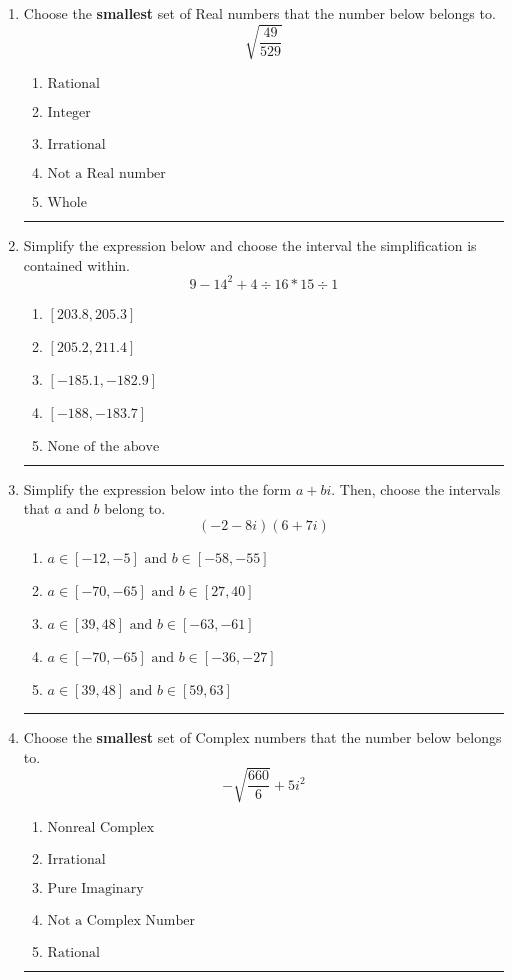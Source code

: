 \documentclass[14pt]{extbook}
\newcommand{\litem}[1]{\item#1\hspace*{-1cm}\rule{\textwidth}{0.4pt}}
\begin{document}
\begin{enumerate}
{\begin{enumerate}[label=\Alph*.]
\end{enumerate} }
\litem{
Choose the \textbf{smallest} set of Real numbers that the number below belongs to.\[ \sqrt{\frac{49}{529}} \]\begin{enumerate}[label=\Alph*.]
\item \( \text{Rational} \)
\item \( \text{Integer} \)
\item \( \text{Irrational} \)
\item \( \text{Not a Real number} \)
\item \( \text{Whole} \)

\end{enumerate} }
\litem{
Simplify the expression below and choose the interval the simplification is contained within.\[ 9 - 14^2 + 4 \div 16 * 15 \div 1 \]\begin{enumerate}[label=\Alph*.]
\item \( [203.8, 205.3] \)
\item \( [205.2, 211.4] \)
\item \( [-185.1, -182.9] \)
\item \( [-188, -183.7] \)
\item \( \text{None of the above} \)

\end{enumerate} }
\litem{
Simplify the expression below into the form $a+bi$. Then, choose the intervals that $a$ and $b$ belong to.\[ (-2 - 8 i)(6 + 7 i) \]\begin{enumerate}[label=\Alph*.]
\item \( a \in [-12, -5] \text{ and } b \in [-58, -55] \)
\item \( a \in [-70, -65] \text{ and } b \in [27, 40] \)
\item \( a \in [39, 48] \text{ and } b \in [-63, -61] \)
\item \( a \in [-70, -65] \text{ and } b \in [-36, -27] \)
\item \( a \in [39, 48] \text{ and } b \in [59, 63] \)

\end{enumerate} }
\litem{
Choose the \textbf{smallest} set of Complex numbers that the number below belongs to.\[ -\sqrt{\frac{660}{6}}+5i^2 \]\begin{enumerate}[label=\Alph*.]
\item \( \text{Nonreal Complex} \)
\item \( \text{Irrational} \)
\item \( \text{Pure Imaginary} \)
\item \( \text{Not a Complex Number} \)
\item \( \text{Rational} \)


\end{enumerate}}
\end{enumerate}
\end{document}
